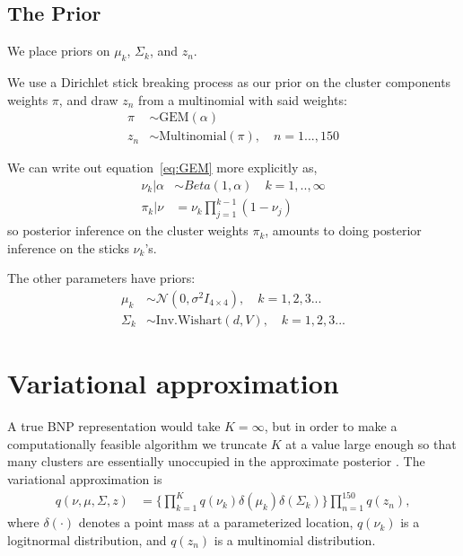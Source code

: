 \documentclass[a4paper]{article}
\begin{document}
\subsection{The Prior}
We place priors on $\mu_k$, $\Sigma_k$, and $z_n$. \par

We use a Dirichlet stick breaking process \cite{ferguson:1973:bayesian, sethuraman:1994:constructivedp} as our prior on the cluster components
weights $\pi$, and draw $z_n$ from a multinomial with said weights:
\begin{align}
	\pi &\sim \text{GEM}(\alpha) \label{eq:GEM} \\
	 z_n &\sim \text{Multinomial}(\pi), \quad n = 1..., 150
\end{align}

We can write out equation~\ref{eq:GEM} more explicitly as,
\begin{align}
  \nu_k | \alpha &\sim Beta(1, \alpha) \quad k = 1, .., \infty \label{eq:beta_sticks}\\
  \pi_k | \nu &= \nu_k \prod_{j=1}^{k-1} (1 - \nu_j) \label{eq:stick_breaking}
\end{align}
so posterior inference on the cluster weights $\pi_k$, amounts to doing
posterior inference on the sticks $\nu_k$'s.

The other parameters have priors:
\begin{align}
	\mu_k &\sim \mathcal{N}(0, \sigma^2 I_{4\times 4}), \quad k = 1, 2, 3 ... \\
	\Sigma_k &\sim \text{Inv.Wishart}(d, V), \quad k = 1, 2, 3 ...
\end{align}


\section{Variational approximation}
A true BNP representation would take $K = \infty$, but in order to make a computationally feasible
algorithm we truncate $K$ at a value large enough so that many clusters are essentially unoccupied in
the approximate posterior \cite{blei:2006:dirichletbnp}. The variational approximation is
\begin{align}
q(\nu, \mu, \Sigma, z) & =
\Big\{\prod_{k=1}^{K}q\left(\nu_{k}\right)\delta\left(\mu_{k}\right)\delta\left(\Sigma_{k}\right)\Big\} \prod_{n=1}^{150}q\left(z_{n}\right),
\end{align}
where $\delta\left(\cdot\right)$ denotes a point mass at a parameterized
location, $q\left(\nu_{k}\right)$ is a logitnormal distribution, and $q\left(z_{n}\right)$
is a multinomial distribution.
\end{document}
